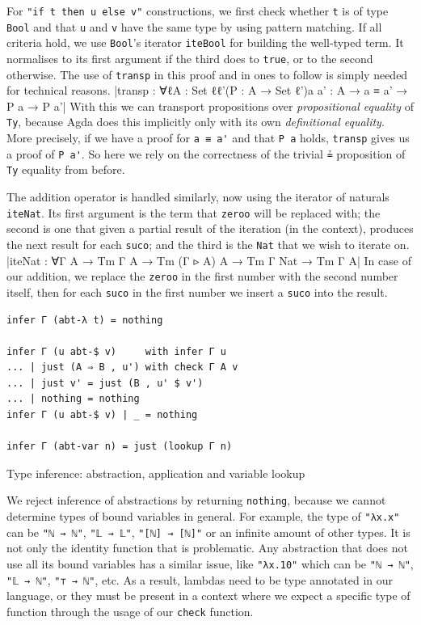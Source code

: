 For \verb$"if t then u else v"$ constructions, we first check whether \verb$t$ is of type \verb$Bool$ and that \verb$u$ and \verb$v$ have the same type by using pattern matching. If all criteria hold, we use \verb$Bool$'s iterator \verb$iteBool$ for building the well-typed term. It normalises to its first argument if the third does to \verb$true$, or to the second otherwise. The use of \verb$transp$ in this proof and in ones to follow is simply needed for technical reasons.
|transp : ∀{ℓ}{A : Set ℓ}{ℓ'}(P : A → Set ℓ'){a a' : A} → a ≡ a' → P a → P a'|
With this we can transport propositions over \textit{propositional equality} of \verb$Ty$, because Agda does this implicitly only with its own \textit{definitional equality}. More precisely, if we have a proof for \verb$a ≡ a'$ and that \verb$P a$ holds, \verb$transp$ gives us a proof of \verb$P a'$. So here we rely on the correctness of the trivial \verb$≟$ proposition of \verb$Ty$ equality from before.

The addition operator is handled similarly, now using the iterator of naturals \verb$iteNat$. Its first argument is the term that \verb$zeroo$ will be replaced with; the second is one that given a partial result of the iteration (in the context), produces the next result for each \verb$suco$; and the third is the \verb$Nat$ that we wish to iterate on.
|iteNat : ∀{Γ A} → Tm Γ A → Tm (Γ ▹ A) A → Tm Γ Nat → Tm Γ A|
In case of our addition, we replace the \verb$zeroo$ in the first number with the second number itself, then for each \verb$suco$ in the first number we insert a \verb$suco$ into the result.

\begin{listing}[H]
\begin{verbatim}
infer Γ (abt-λ t) = nothing

infer Γ (u abt-$ v)     with infer Γ u
... | just (A ⇒ B , u') with check Γ A v
... | just v' = just (B , u' $ v')
... | nothing = nothing
infer Γ (u abt-$ v) | _ = nothing

infer Γ (abt-var n) = just (lookup Γ n)
\end{verbatim}
\caption{Type inference: abstraction, application and variable lookup}
\label{code:typecheck-infer-lam}
\end{listing}

We reject inference of abstractions by returning \verb$nothing$, because we cannot determine types of bound variables in general. For example, the type of \verb$"λx.x"$ can be \verb$"ℕ → ℕ"$, \verb$"𝕃 → 𝕃"$, \verb$"[ℕ] → [ℕ]"$ or an infinite amount of other types. It is not only the identity function that is problematic. Any abstraction that does not use all its bound variables has a similar issue, like \verb$"λx.10"$ which can be \verb$"ℕ → ℕ"$, \verb$"𝕃 → ℕ"$, \verb$"⊤ → ℕ"$, etc. As a result, lambdas need to be type annotated in our language, or they must be present in a context where we expect a specific type of function through the usage of our \verb$check$ function.


